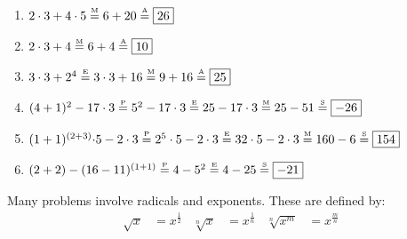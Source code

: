 \documentclass[crop=false,class=book,oneside]{standalone}                      %
\begin{document}
            \begin{fexample}{}{}
                \begin{enumerate}
                    \item ${2}\cdot{3}+{4}\cdot{5}%
                           \overset{\textrm{\tiny{M}}}{=}%
                           6+20\overset{\textrm{\tiny{A}}}{=}%
                           \boxed{26}$
                    \item ${2}\cdot{3}%
                           +4\overset{\textrm{\tiny{M}}}{=}%
                           6+4\overset{\textrm{\tiny{A}}}{=}%
                           \boxed{10}$
                    \item ${3}\cdot{3+2^{4}}%
                           \overset{\textrm{\tiny{E}}}{=}%
                           {3}\cdot {3}+16%
                           \overset{\textrm{\tiny{M}}}{=}%
                           9+16\overset{\textrm{\tiny{A}}}{=}%
                           \boxed{25}$
                    \item $(4+1)^2-17\cdot 3%
                        \overset{\textrm{\tiny{P}}}{=}%
                        5^{2}-17\cdot 3%
                        \overset{\textrm{\tiny{E}}}{=}25-17\cdot 3%
                        \overset{\textrm{\tiny{M}}}{=}25-51%
                        \overset{\textrm{\tiny{S}}}{=}\boxed{-26}$
                    \item ${(1+1)^{(2+3)}\cdot}{5}-%
                           {2}\cdot{3}
                           \overset{\textrm{\tiny{P}}}{=}%
                           {2^{5}}\cdot{5}-{2}\cdot{3}%
                           \overset{\textrm{\tiny{E}}}{=}%
                           {32}\cdot{5}-{2}\cdot{3}%
                           \overset{\textrm{\tiny{M}}}{=}%
                           160-6\overset{\textrm{\tiny{S}}}{=}%
                           \boxed{154}$
                    \item $(2+2)-(16-11)^{(1+1)}%
                           \overset{\textrm{\tiny{P}}}{=}4-5^{2}%
                           \overset{\textrm{\tiny{E}}}{=}4-25%
                           \overset{\textrm{\tiny{S}}}{=}%
                           \boxed{-21}$
                \end{enumerate}
            \end{fexample}
            Many problems involve radicals and exponents.
            These are defined by:
            \begin{align*}
                \sqrt{x}&=x^{\frac{1}{2}}
                &
                \sqrt[n]{x}&=x^{\frac{1}{n}}
                &
                \sqrt[n]{x^m}&=x^{\frac{m}{n}}
            \end{align*}
\end{document}
